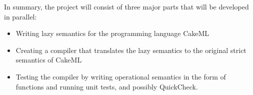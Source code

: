 In summary, the project will consist of three major parts that will be developed
in parallel:
\begin{itemize}
 \item Writing lazy semantics for the programming language CakeML
 \item Creating a compiler that translates the lazy semantics to the original strict semantics of CakeML
 \item Testing the compiler by writing operational semantics in the form of functions and running unit tests, and possibly QuickCheck.
\end{itemize}
